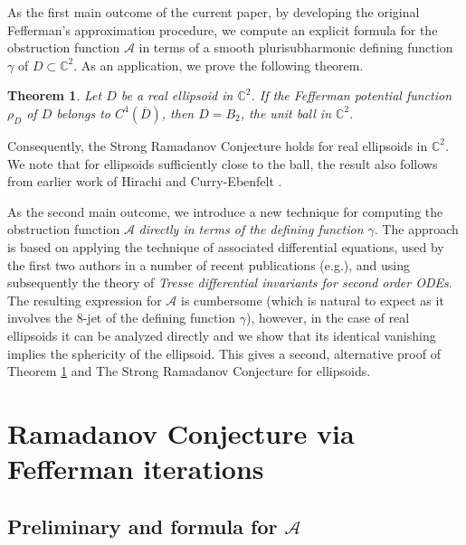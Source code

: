 \documentclass[12pt]{amsart}
\newtheorem{theorem}{Theorem}[section]
\def\CC{\mathbb{C}}
\def\cal{\mathcal}
\begin{document}
As the first main outcome of the current paper, by developing the original Fefferman's approximation procedure, we compute an explicit formula for the obstruction function ${\cal A}$ in terms of a smooth  plurisubharmonic defining function $\gamma$ of $D\subset \CC^2$. As an application, 
we prove the following theorem.
\begin{theorem}\label{main} Let $D$ be a real ellipsoid in $\CC^2$. If the Fefferman potential function $\rho_D$ of $D$ belongs to $C^4(\overline{D})$, then $D=B_2$, the unit ball in $\CC^2$.
\end{theorem} 
Consequently, the Strong Ramadanov Conjecture  holds for real ellipsoids in $\CC^2$. We note that for ellipsoids sufficiently close to the ball, the result also follows from earlier work of Hirachi \cite{Hi93} and Curry-Ebenfelt \cite{CE19}.

As the second main outcome, we introduce a new technique for computing the obstruction function $\mathcal A$ {\em directly in terms of the defining function $\gamma$}. The approach is based on applying the technique of associated differential equations, used by the first two authors in a number of recent publications (e.g.\cite{divergence,nonminimalODE,nonanalytic,hjy}), and using subsequently the theory of {\em Tresse differential invariants for second order ODEs}. The resulting expression for $\mathcal A$ is cumbersome (which is natural to expect as it involves the $8$-jet of the defining function $\gamma$), however, in the case of real ellipsoids it can be analyzed directly and we show that its identical vanishing implies the sphericity of the ellipsoid. This gives a second, alternative proof of Theorem \ref{main} and The Strong Ramadanov Conjecture for ellipsoids. 

\section{Ramadanov Conjecture via Fefferman iterations}

\subsection{Preliminary and formula for ${\cal A}$}
\end{document}
